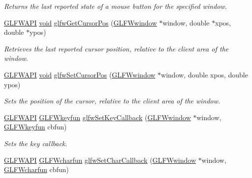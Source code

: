 \begin{DoxyCompactItemize}
\begin{DoxyCompactList}\small\item\em Returns the last reported state of a mouse button for the specified window. \end{DoxyCompactList}\item 
\hyperlink{glfw3_8h_a56da5036b2cc259351ae22fd6439bb47}{G\-L\-F\-W\-A\-P\-I} \hyperlink{wglew_8h_aeea6e3dfae3acf232096f57d2d57f084}{void} \hyperlink{group__input_gad289438eb7cf53d11eca685373f44105}{glfw\-Get\-Cursor\-Pos} (\hyperlink{group__window_ga3c96d80d363e67d13a41b5d1821f3242}{G\-L\-F\-Wwindow} $\ast$window, double $\ast$xpos, double $\ast$ypos)
\begin{DoxyCompactList}\small\item\em Retrieves the last reported cursor position, relative to the client area of the window. \end{DoxyCompactList}\item 
\hyperlink{glfw3_8h_a56da5036b2cc259351ae22fd6439bb47}{G\-L\-F\-W\-A\-P\-I} \hyperlink{wglew_8h_aeea6e3dfae3acf232096f57d2d57f084}{void} \hyperlink{group__input_gaaf152cc93418acb0ba342e3f4af922bc}{glfw\-Set\-Cursor\-Pos} (\hyperlink{group__window_ga3c96d80d363e67d13a41b5d1821f3242}{G\-L\-F\-Wwindow} $\ast$window, double xpos, double ypos)
\begin{DoxyCompactList}\small\item\em Sets the position of the cursor, relative to the client area of the window. \end{DoxyCompactList}\item 
\hyperlink{glfw3_8h_a56da5036b2cc259351ae22fd6439bb47}{G\-L\-F\-W\-A\-P\-I} \hyperlink{group__input_ga592dd1919f8a1dc7576b13cdd8b7b695}{G\-L\-F\-Wkeyfun} \hyperlink{group__input_gaa73bb92f628a2a0be9c132d56f19362c}{glfw\-Set\-Key\-Callback} (\hyperlink{group__window_ga3c96d80d363e67d13a41b5d1821f3242}{G\-L\-F\-Wwindow} $\ast$window, \hyperlink{group__input_ga592dd1919f8a1dc7576b13cdd8b7b695}{G\-L\-F\-Wkeyfun} cbfun)
\begin{DoxyCompactList}\small\item\em Sets the key callback. \end{DoxyCompactList}\item 
\hyperlink{glfw3_8h_a56da5036b2cc259351ae22fd6439bb47}{G\-L\-F\-W\-A\-P\-I} \hyperlink{group__input_ga1103f1876518acecb5976f6b307c51d1}{G\-L\-F\-Wcharfun} \hyperlink{group__input_ga07b2959b23dc3e466ce7475746021002}{glfw\-Set\-Char\-Callback} (\hyperlink{group__window_ga3c96d80d363e67d13a41b5d1821f3242}{G\-L\-F\-Wwindow} $\ast$window, \hyperlink{group__input_ga1103f1876518acecb5976f6b307c51d1}{G\-L\-F\-Wcharfun} cbfun)

\end{DoxyCompactItemize}

